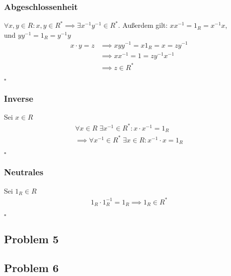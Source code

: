 \documentclass[12pt, german]{article}
\newcommand{\bewiesen}{\begin{flushright}$\square$ \end{flushright} }
\begin{document}
    	\subsubsection*{Abgeschlossenheit}
    	 $\forall x,y \in R : x,y \in R^\ast \implies \exists x^{-1} y^{-1} \in R^\ast$. 
   	 Außerdem gilt: $xx^{-1} = 1_R = x^{-1}x$, \\ und $yy^{-1} = 1_R = y^{-1}y $
    	\begin{align*}
    		x \cdot y = z &\implies xyy^{-1} = x1_R=x=zy^{-1} \\
    		&\implies xx^{-1} = 1 = zy^{-1}x^{-1} \\
    			&\implies z \in R^\ast
    	\end{align*} \bewiesen
    	\subsubsection*{Inverse}
    	Sei $x \in R$ 
    		\begin{align*} 
    		 \forall  x \in R \; \exists x^{-1} \in R^\ast : x\cdot x^{-1} = 1_R  \\
    		 \implies \forall x^{-1} \in R^\ast \; \exists x \in R : x^{-1} \cdot x = 1_R
    	\end{align*} \bewiesen
    	
    	\subsubsection*{Neutrales}
    		Sei $1_R \in R$ 
    		\begin{align*}
    			1_R \cdot 1_R^{-1} = 1_R \implies 1_R \in R^\ast
    	\end{align*} \bewiesen
 
    \subsection*{Problem 5}
    \subsection*{Problem 6}
    		
    
    
    
\end{document}
